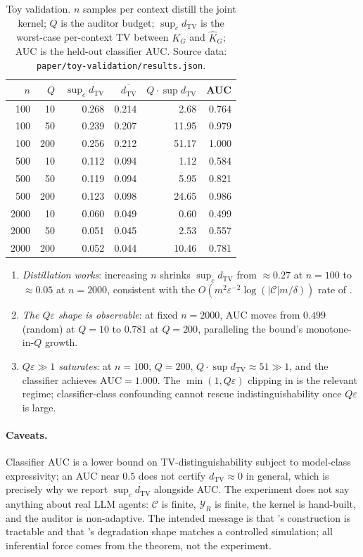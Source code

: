 \documentclass{article}
\theoremstyle{plain}
\theoremstyle{definition}
\theoremstyle{remark}
\newcommand{\TV}{\mathrm{TV}}
\newcommand{\dtv}{d_{\TV}}
\newcommand{\C}{\mathcal{C}}
\newcommand{\YR}{\mathcal{Y}_R}
\begin{document}
\begin{table}[h]
\centering\small
\begin{tabular}{rrrrrr}
\toprule
$n$ & $Q$ & $\sup_c \dtv$ & $\overline{\dtv}$ & $Q \cdot \sup \dtv$ & AUC \\
\midrule
100  & 10  & 0.268 & 0.214 & 2.68  & 0.764 \\
100  & 50  & 0.239 & 0.207 & 11.95 & 0.979 \\
100  & 200 & 0.256 & 0.212 & 51.17 & 1.000 \\
\midrule
500  & 10  & 0.112 & 0.094 & 1.12  & 0.584 \\
500  & 50  & 0.119 & 0.094 & 5.95  & 0.821 \\
500  & 200 & 0.123 & 0.098 & 24.65 & 0.986 \\
\midrule
2000 & 10  & 0.060 & 0.049 & 0.60  & 0.499 \\
2000 & 50  & 0.051 & 0.045 & 2.53  & 0.557 \\
2000 & 200 & 0.052 & 0.044 & 10.46 & 0.781 \\
\bottomrule
\end{tabular}
\caption{Toy validation. $n$ samples per context distill the joint kernel; $Q$ is
the auditor budget; $\sup_c \dtv$ is the worst-case per-context TV between $K_G$
and $\hat K_G$; AUC is the held-out classifier AUC. Source data:
\texttt{paper/toy-validation/results.json}.}
\label{tab:toy-results}
\end{table}

\begin{enumerate}
  \item \emph{Distillation works}: increasing $n$ shrinks $\sup_c \dtv$ from
    $\approx 0.27$ at $n = 100$ to $\approx 0.05$ at $n = 2000$, consistent
    with the $O(m^2 \varepsilon^{-2} \log(|\C| m / \delta))$ rate of
    .
  \item \emph{The $Q\varepsilon$ shape is observable}: at fixed $n = 2000$,
    AUC moves from $0.499$ (random) at $Q = 10$ to $0.781$ at $Q = 200$,
    paralleling the bound's monotone-in-$Q$ growth.
  \item \emph{$Q\varepsilon \gg 1$ saturates}: at $n = 100$, $Q = 200$,
    $Q \cdot \sup \dtv \approx 51 \gg 1$, and the classifier achieves
    $\mathrm{AUC} = 1.000$. The $\min(1, Q\varepsilon)$ clipping in
     is the relevant regime; classifier-class confounding
    cannot rescue indistinguishability once $Q\varepsilon$ is large.
\end{enumerate}

\paragraph{Caveats.}
Classifier AUC is a lower bound on TV-distinguishability subject to model-class
expressivity; an AUC near $0.5$ does not certify $\dtv \approx 0$ in general,
which is precisely why we report $\sup_c \dtv$ alongside AUC. The experiment
does not say anything about real LLM agents: $\C$ is finite, $\YR$ is finite,
the kernel is hand-built, and the auditor is non-adaptive. The intended message
is that 's construction is tractable and that
's degradation shape matches a controlled simulation; all
inferential force comes from the theorem, not the experiment.
\end{document}
